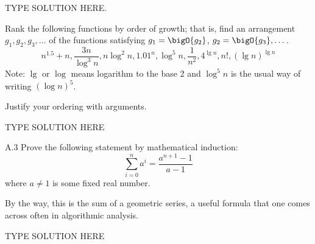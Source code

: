 \documentclass[final]{article}
\begin{document}
\begin{solution}
    TYPE SOLUTION HERE.
\end{solution}

\begin{exercise}{2.12}
    Rank the following functions by order of growth; that is, find an
    arrangement $g_1, g_2, g_3, \dots$ of the functions satisfying
    $g_1=\bigO{g_2}$, $g_2=\bigO{g_3}, \dots$.
    \[n^{1.5} + n, \frac{3n}{\log^3 n}, n \log^2 n, 1.01^n,   \log^{5} n,
        \frac{1}{n^2},  4^{\lg n}, n!,  (\lg n)^{\lg n}\]
    Note: $\lg$ or $\log$ means logarithm to the base 2 and $\log^{5} n$ is the usual way of writing
    $(\log n)^{5}$.

    Justify your ordering with arguments.
\end{exercise}

\begin{solution}
    TYPE SOLUTION HERE
\end{solution}

\begin{exercise}{A.3}
    Prove the following statement by mathematical induction:
    \[\sum_{i=0}^n a^i = \frac{a^{n+1} - 1}{a-1}\] where $a \neq 1$
    is some fixed real number.

    By the way, this is the sum of a geometric series, a useful
    formula that one comes across often in algorithmic analysis.
\end{exercise}

\begin{solution}
    TYPE SOLUTION HERE
\end{solution}
\end{document}
